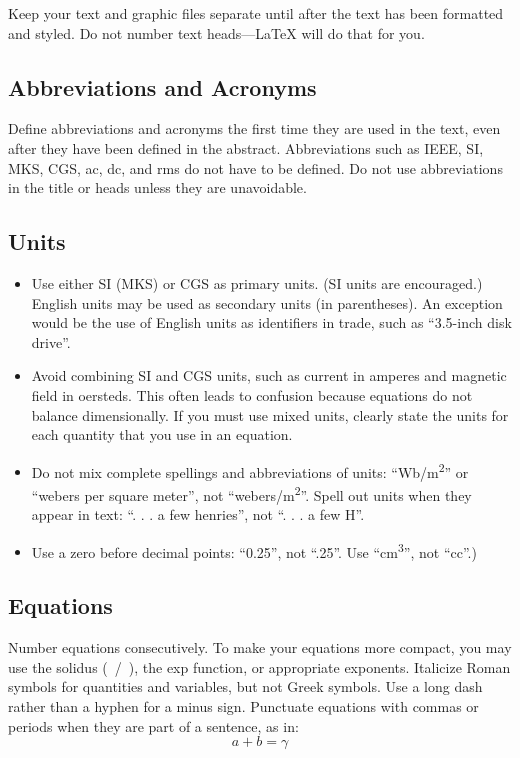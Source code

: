 \documentclass[conference]{IEEEtran}
\begin{document}
Keep your text and graphic files separate until after the text has been 
formatted and styled. Do not number text heads---{\LaTeX} will do that 
for you.

\subsection{Abbreviations and Acronyms}\label{AA}
Define abbreviations and acronyms the first time they are used in the text, 
even after they have been defined in the abstract. Abbreviations such as 
IEEE, SI, MKS, CGS, ac, dc, and rms do not have to be defined. Do not use 
abbreviations in the title or heads unless they are unavoidable.

\subsection{Units}
\begin{itemize}
\item Use either SI (MKS) or CGS as primary units. (SI units are encouraged.) English units may be used as secondary units (in parentheses). An exception would be the use of English units as identifiers in trade, such as ``3.5-inch disk drive''.
\item Avoid combining SI and CGS units, such as current in amperes and magnetic field in oersteds. This often leads to confusion because equations do not balance dimensionally. If you must use mixed units, clearly state the units for each quantity that you use in an equation.
\item Do not mix complete spellings and abbreviations of units: ``Wb/m\textsuperscript{2}'' or ``webers per square meter'', not ``webers/m\textsuperscript{2}''. Spell out units when they appear in text: ``. . . a few henries'', not ``. . . a few H''.
\item Use a zero before decimal points: ``0.25'', not ``.25''. Use ``cm\textsuperscript{3}'', not ``cc''.)
\end{itemize}

\subsection{Equations}
Number equations consecutively. To make your 
equations more compact, you may use the solidus (~/~), the exp function, or 
appropriate exponents. Italicize Roman symbols for quantities and variables, 
but not Greek symbols. Use a long dash rather than a hyphen for a minus 
sign. Punctuate equations with commas or periods when they are part of a 
sentence, as in:
\begin{equation}
a+b=\gamma\label{eq}
\end{equation}
\end{document}
